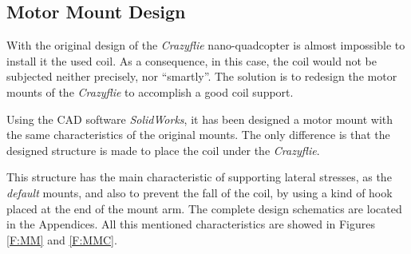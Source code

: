   \subsection{Motor Mount Design}

With the original design of the \textit{Crazyflie} nano-quadcopter is almost impossible to install it the used coil. As a consequence, in this case, the coil would not be subjected neither precisely, nor ``smartly''. The solution is to redesign the motor mounts of the \textit{Crazyflie} to accomplish a good coil support.

Using the CAD software \textit{SolidWorks}, it has been designed a motor mount with the same characteristics of the original mounts. The only difference is that the designed structure is made to place the coil under the \textit{Crazyflie}. 


This structure has the main characteristic of supporting lateral stresses, as the \textit{default} mounts, and also to prevent the fall of the coil, by using a kind of hook placed at the end of the mount arm. The complete design schematics are located in the Appendices. All this mentioned characteristics are showed in Figures \ref{F:MM} and \ref{F:MMC}. 

